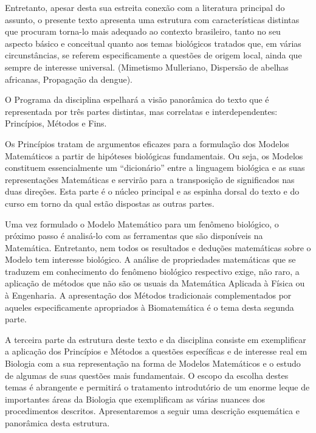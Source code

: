Entretanto, apesar desta sua estreita conexão com a literatura principal do assunto, o presente texto apresenta uma estrutura com características distintas que procuram torna-lo mais adequado ao contexto brasileiro, tanto no seu aspecto básico e conceitual quanto aos temas biológicos tratados que, em várias circunstâncias, se referem especificamente a questões de origem local, ainda que sempre de interesse universal. (Mimetismo Mulleriano, Dispersão de abelhas africanas, Propagação da dengue).

O Programa da disciplina espelhará a visão panorâmica do texto que é representada por três partes distintas, mas correlatas e interdependentes: Princípios, Métodos e Fins.

Os Princípios tratam de argumentos eficazes para a formulação dos Modelos Matemáticos a partir de hipóteses biológicas fundamentais. Ou seja, os Modelos constituem essencialmente um ``dicionário'' entre a linguagem biológica e as suas representações Matemáticas e servirão para a transposição de significados nas duas direções. Esta parte é o núcleo principal e as espinha dorsal do texto e do curso em torno da qual estão dispostas as outras partes.

Uma vez formulado o Modelo Matemático para um fenômeno biológico, o próximo passo é analisá-lo com as ferramentas que são disponíveis na Matemática. Entretanto, nem todos os resultados e deduções matemáticas sobre o Modelo tem interesse biológico. A análise de propriedades matemáticas que se traduzem em conhecimento do fenômeno biológico respectivo exige, não raro, a aplicação de métodos que não são os usuais da Matemática Aplicada à Física ou à Engenharia. A apresentação dos Métodos tradicionais complementados por aqueles especificamente apropriados à Biomatemática é o tema desta segunda parte.

A terceira parte da estrutura deste texto e da disciplina consiste em exemplificar a aplicação dos Princípios e Métodos a questões específicas e de interesse real em Biologia com a sua representação na forma de Modelos Matemáticos e o estudo de algumas de suas questões mais fundamentais. O escopo da escolha destes temas é abrangente e permitirá o tratamento introdutório de um enorme leque de importantes áreas da Biologia que exemplificam as várias nuances dos procedimentos descritos.
Apresentaremos a seguir uma descrição esquemática e panorâmica desta estrutura.

